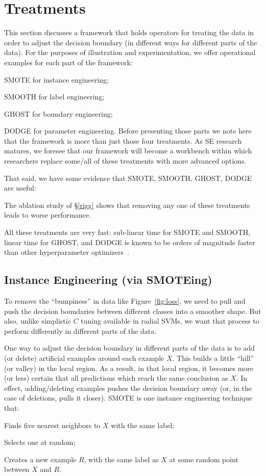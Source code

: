 \section{  Treatments}\label{rx}

 This section discusses a framework that holds
 operators for   treating the data in order to adjust  the decision boundary (in different ways for different parts of the data). For the purposes of illustration and experimentation,
 we offer operational examples for each part of the framework:
 \bi
 \item  SMOTE for instance engineering;
 \item  SMOOTH for label engineering;
 \item   GHOST for boundary engineering;
 \item   DODGE for parameter engineering.
 \ei
 Before presenting those parts we note here that the framework is more than just those four treatments. 
 As SE research matures, we foresee that our framework will become a workbench   within which researchers replace some/all of these treatments with more advanced options.
 
 That said, we have some evidence that  SMOTE, SMOOTH, GHOST, DODGE are useful:
 \bi
  \item
The ablation study of \S\ref{rigg}  shows that removing any one of these treatments leads to worse performance.
 \item
All these treatments are  very fast: sub-linear time for SMOTE and SMOOTH, linear time for GHOST, and DODGE is known to be orders of magnitude faster than other hyperparameter optimizers~\cite{agrawal2019dodge}.
 \ei


 

\subsection{Instance Engineering (via SMOTEing)}
To remove the ``bumpiness'' in data like Figure~\ref{fig:loss}, we need to 
pull and push the decision boundaries between different classes into a smoother shape.
But also, unlike simplistic $C$ tuning available in radial  SVMs, we want that process to perform differently
in different parts of the data.

One way to adjust the decision boundary in different parts of the data is 
to add (or delete)  artificial examples around each example $X$. This builds a little ``hill'' (or valley) in the local region.
As a result, in that local region,
 it becomes more (or less)
certain that all predictions which reach the same conclusion as $X$. In effect, adding/deleting
examples pushes the decision boundary away (or, in the case of deletions, pulls it closer).
SMOTE \cite{chawla2002smote} is one instance engineering technique that:
\bi
\item Finds  five nearest neighbors
to   $X$ with the same label;
\item  Selects one at random;
\item Creates a new example $R$, with the same label as $X$ at some random point
between $X$ and $R$.
\ei

